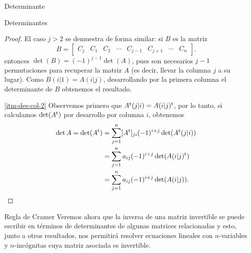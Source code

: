 \begin{chapter}{Determinante}
\begin{section}{Determinantes}
\begin{proof}
        El caso $j>2$  se demuestra de forma similar: si $B$ es la matriz
        $$
            B = \begin{bmatrix} C_j &C_1 &C_2 &\cdots& C_{j-1}&C_{j+1}&\cdots &C_n\end{bmatrix}.
        $$
        entonces $\det(B)=(-1)^{j-1}\det(A)$, pues son necesarios $j-1$ permutaciones para recuperar la matriz $A$ (es decir, llevar la columna $j$ a su lugar).
        Como $B(i|1) = A(i|j)$,  desarrollando por la primera columna el determinante de $B$ obtenemos el resultado.


        \ref{itm-des-col-2} Observemos primero que $A^{\operatorname{t}}(j|i) = A(i|j)^{\operatorname{t}}$, por lo tanto, si calculamos $\det(A^{\operatorname{t}})$ por desarrollo por columna $i$, obtenemos
        \begin{align*}
            \det A = \det(A^{\operatorname{t}}) & =\sum_{j=1}^{n} [A^{\operatorname{t}}]_{ji} (-1)^{i+j}\det (A^{\operatorname{t}}(j|i)) \\
                                & =  \sum_{j=1}^{n} a_{ij} (-1)^{i+j}\det (A(i|j)^{\operatorname{t}})    \\
                                & = \sum_{j=1}^{n} a_{ij} (-1)^{i+j}\det (A(i|j)).
        \end{align*}
    \end{proof}

 \end{section}

 \begin{section}{Regla de Cramer}\label{seccion-regla-de-cramer} Veremos ahora que la inversa de una matriz invertible se puede escribir en términos de determinantes de algunas matrices relacionadas y esto, junto a otros resultados, nos permitirá resolver ecuaciones lineales con $n$-variables y $n$-incógnitas cuya matriz asociada es invertible.


\end{section}
\end{chapter}

